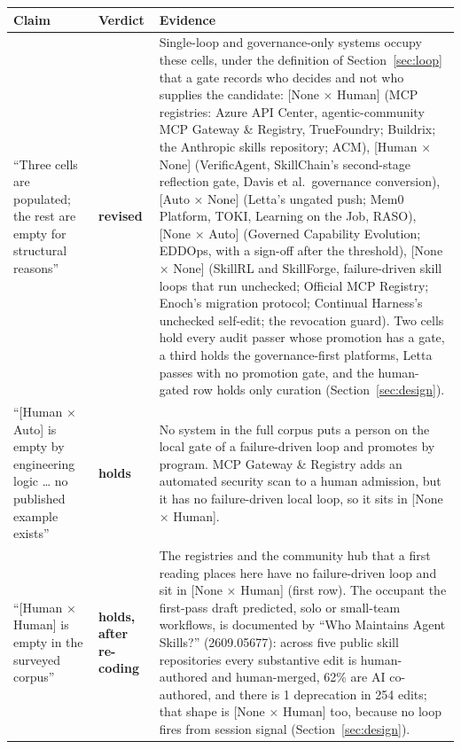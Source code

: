 \documentclass[
  11pt,
]{article}
\newcounter{none} %
\begin{document}
{\def\LTcaptype{none} %
\begin{longtable}[]{@{}
  >{\raggedright\arraybackslash}p{}
  >{\raggedright\arraybackslash}p{}
  >{\raggedright\arraybackslash}p{}@{}}
\toprule\noalign{}
\begin{minipage}[b]{\linewidth}\raggedright
Claim
\end{minipage} & \begin{minipage}[b]{\linewidth}\raggedright
Verdict
\end{minipage} & \begin{minipage}[b]{\linewidth}\raggedright
Evidence
\end{minipage} \\
\midrule\noalign{}
\endhead
\bottomrule\noalign{}
\endlastfoot
``Three cells are populated; the rest are empty for structural reasons'' & \textbf{revised} & Single-loop and governance-only systems occupy these cells, under the definition of Section~\ref{sec:loop} that a gate records who decides and not who supplies the candidate: {[}None × Human{]} (MCP registries: Azure API Center, agentic-community MCP Gateway \& Registry, TrueFoundry; Buildrix; the Anthropic skills repository; ACM), {[}Human × None{]} (VerificAgent, SkillChain's second-stage reflection gate, Davis et al.~governance conversion), {[}Auto × None{]} (Letta's ungated push; Mem0 Platform, TOKI, Learning on the Job, RASO), {[}None × Auto{]} (Governed Capability Evolution; EDDOps, with a sign-off after the threshold), {[}None × None{]} (SkillRL and SkillForge, failure-driven skill loops that run unchecked; Official MCP Registry; Enoch's migration protocol; Continual Harness's unchecked self-edit; the revocation guard). Two cells hold every audit passer whose promotion has a gate, a third holds the governance-first platforms, Letta passes with no promotion gate, and the human-gated row holds only curation (Section~\ref{sec:design}). \\
``{[}Human × Auto{]} is empty by engineering logic \ldots{} no published example exists'' & \textbf{holds} & No system in the full corpus puts a person on the local gate of a failure-driven loop and promotes by program. MCP Gateway \& Registry adds an automated security scan to a human admission, but it has no failure-driven local loop, so it sits in {[}None × Human{]}. \\
``{[}Human × Human{]} is empty in the surveyed corpus'' & \textbf{holds, after re-coding} & The registries and the community hub that a first reading places here have no failure-driven loop and sit in {[}None × Human{]} (first row). The occupant the first-pass draft predicted, solo or small-team workflows, is documented by ``Who Maintains Agent Skills?'' (2609.05677): across five public skill repositories every substantive edit is human-authored and human-merged, 62\% are AI co-authored, and there is 1 deprecation in 254 edits; that shape is {[}None × Human{]} too, because no loop fires from session signal (Section~\ref{sec:design}). \\

\end{longtable}}
\end{document}
